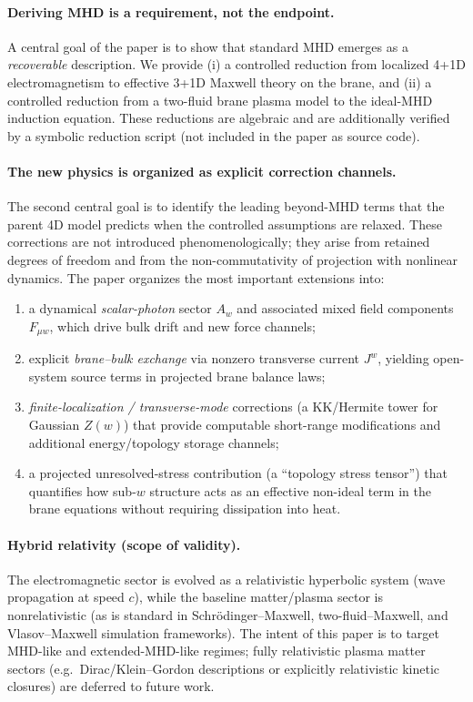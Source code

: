 \documentclass[11pt]{article}
\begin{document}
\paragraph{Deriving MHD is a requirement, not the endpoint.}
A central goal of the paper is to show that standard MHD emerges as a \emph{recoverable} description. We provide (i) a controlled reduction from localized 4+1D electromagnetism to effective 3+1D Maxwell theory on the brane, and (ii) a controlled reduction from a two-fluid brane plasma model to the ideal-MHD induction equation. These reductions are algebraic and are additionally verified by a symbolic reduction script (not included in the paper as source code).

\paragraph{The new physics is organized as explicit correction channels.}
The second central goal is to identify the leading beyond-MHD terms that the parent 4D model predicts when the controlled assumptions are relaxed. These corrections are not introduced phenomenologically; they arise from retained degrees of freedom and from the non-commutativity of projection with nonlinear dynamics. The paper organizes the most important extensions into:
\begin{enumerate}[leftmargin=1.5em]
\item a dynamical \emph{scalar-photon} sector \(A_w\) and associated mixed field components \(F_{\mu w}\), which drive bulk drift and new force channels;
\item explicit \emph{brane--bulk exchange} via nonzero transverse current \(J^w\), yielding open-system source terms in projected brane balance laws;
\item \emph{finite-localization / transverse-mode} corrections (a KK/Hermite tower for Gaussian \(Z(w)\)) that provide computable short-range modifications and additional energy/topology storage channels;
\item a projected unresolved-stress contribution (a ``topology stress tensor'') that quantifies how sub-\(w\) structure acts as an effective non-ideal term in the brane equations without requiring dissipation into heat.
\end{enumerate}

\paragraph{Hybrid relativity (scope of validity).}
The electromagnetic sector is evolved as a relativistic hyperbolic system (wave propagation at speed \(c\)), while the baseline matter/plasma sector is nonrelativistic (as is standard in Schr\"odinger--Maxwell, two-fluid--Maxwell, and Vlasov--Maxwell simulation frameworks). The intent of this paper is to target MHD-like and extended-MHD-like regimes; fully relativistic plasma matter sectors (e.g.\ Dirac/Klein--Gordon descriptions or explicitly relativistic kinetic closures) are deferred to future work.
\end{document}
